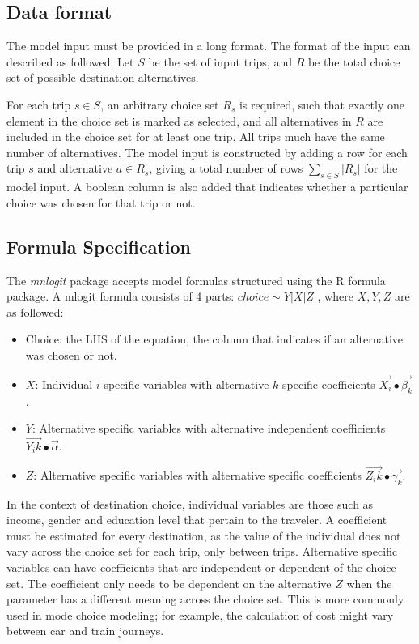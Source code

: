\subsection*{Data format}
The model input must be provided in a long format. The format of the input can described as followed:
Let \(S\)  be the set of input trips, and \(R\)  be the total choice set of possible destination alternatives. 

For each trip $s \in S$, an arbitrary choice set $R_s$ is required, such that exactly one element in the choice set is marked as selected, and all alternatives in $R$ are included in the choice set for at least one trip. All trips much have the same number of alternatives.
The model input is constructed by adding a row for each trip $s$ and alternative $a \in R_s$, giving a total number of rows  $ \sum_{s \in S} |R_s| $  for the model input. A boolean column is also added that indicates whether a particular choice was chosen for that trip or not.

\subsection*{Formula Specification}
The \textit{mnlogit} package accepts model formulas structured using the R formula package. A mlogit formula consists of 4 parts: $ choice \sim Y | X | Z $ , where $X,Y,Z$ are as followed:

\begin{itemize}
	\item Choice: the LHS of the equation, the column that indicates if an alternative was chosen or not.
	\item $X$: Individual $i$ specific variables with alternative $k$ specific coefficients $\vec{X_i} ∙\vec{\beta_k}$.

	\item $Y$: Alternative specific variables with alternative independent coefficients $\vec{Y_ik} ∙\vec{\alpha}$. 
	\item $Z$: Alternative specific variables with alternative specific coefficients
$\vec{Z_ik} ∙\vec{\gamma_k}$.
\end{itemize}

In the context of destination choice, individual variables are those such as income, gender and education level that pertain to the traveler. A coefficient must be estimated for every destination, as the value of the individual does not vary across the choice set for each trip, only between trips. Alternative specific variables can have coefficients that are independent or dependent of the choice set. The coefficient only needs to be dependent on the alternative $Z$ when the parameter has a different meaning across the choice set. This is more commonly used in mode choice modeling; for example, the calculation of cost might vary between car and train journeys.

